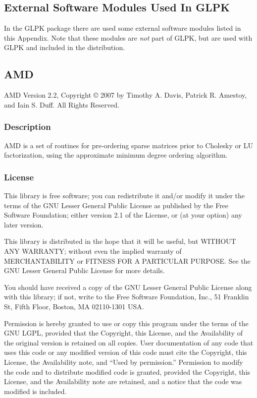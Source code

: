 
\begin{footnotesize}

\chapter{External Software Modules Used In GLPK}

In the GLPK package there are used some external software modules
listed in this Appendix. Note that these modules are {\it not} part of
GLPK, but are used with GLPK and included in the distribution.

\section{AMD}

AMD Version 2.2, Copyright {\copyright} 2007 by Timothy A. Davis,
Patrick R. Amestoy, and Iain S. Duff.  All Rights Reserved.

\subsection*{Description}

AMD is a set of routines for pre-ordering sparse matrices prior to
Cholesky or LU factorization, using the approximate minimum degree
ordering algorithm.

\subsection*{License}

This library is free software; you can redistribute it and/or
modify it under the terms of the GNU Lesser General Public License
as published by the Free Software Foundation; either version 2.1 of
the License, or (at your option) any later version.

This library is distributed in the hope that it will be useful,
but WITHOUT ANY WARRANTY; without even the implied warranty of
MERCHANTABILITY or FITNESS FOR A PARTICULAR PURPOSE.  See the GNU
Lesser General Public License for more details.

You should have received a copy of the GNU Lesser General Public
License along with this library; if not, write to the Free Software
Foundation, Inc., 51 Franklin St, Fifth Floor, Boston, MA 02110-1301
USA.

Permission is hereby granted to use or copy this program under the
terms of the GNU LGPL, provided that the Copyright, this License,
and the Availability of the original version is retained on all
copies.  User documentation of any code that uses this code or any
modified version of this code must cite the Copyright, this License,
the Availability note, and ``Used by permission.''  Permission to
modify the code and to distribute modified code is granted, provided
the Copyright, this License, and the Availability note are retained,
and a notice that the code was modified is included.


\end{footnotesize}
